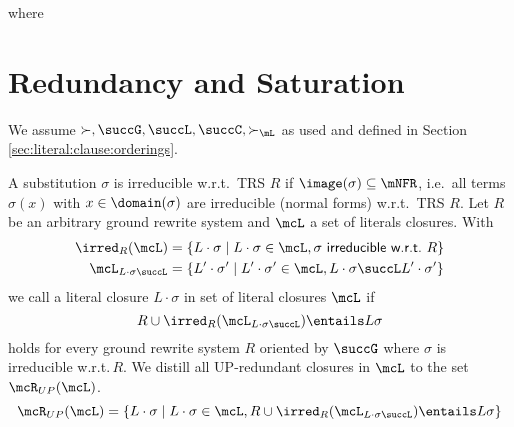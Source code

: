 
\begin{definition}

where

\end{definition}

\section{Redundancy and Saturation}
    We assume \( \succ, \succG, \succL, \succC, \succ_\mL \)
    as used and defined in
    Section \vref{sec:literal:clause:orderings}.

\begin{definition}
    A substitution \( \sigma \) is irreducible w.r.t.~TRS \( R \)
    if
    \( \image(\sigma)\subseteq\mNFR \),
    i.e.~all terms \(\sigma(x)\) with
    \( x\in\domain(\sigma) \) are irreducible (normal forms) w.r.t.~TRS \(R\).
    Let \( R \) be an arbitrary ground rewrite system
    and \( \mcL \) a set of literals closures.
    With
    \begin{align*}
        \irred_R(\mcL) &= \{ L\cdot\sigma \mid L\cdot\sigma\in\mcL,
        \sigma\textsf{ irreducible w.r.t.~}R \}
    \\
        \mcL_{L\cdot\sigma\succL} &= \{
            L'\cdot\sigma'\mid L'\cdot\sigma'\in\mcL, L\cdot\sigma\succL L'\cdot\sigma'
            \}
    \end{align*}
    we call a literal closure \( L\cdot\sigma \) 
    in set of literal closures \( \mcL \)
    if
    \[
        R \cup \irred_R(\mcL_{L\cdot\sigma\succL}) \entails L\sigma
    \]
    holds for every ground rewrite system \( R \) oriented by \( \succG \)
    where \( \sigma \) is irreducible w.r.t.\,\( R \).
    We distill all UP-redundant closures in \( \mcL \) to the set
    \( \mcR_{UP}(\mcL) \).
    \[
        \mcR_{UP}(\mcL) = \{
            L\cdot\sigma
            \mid
            L\cdot\sigma \in \mcL,
            R \cup \irred_R(\mcL_{L\cdot\sigma\succL}) \entails L\sigma
        \}
    \]

\end{definition}

